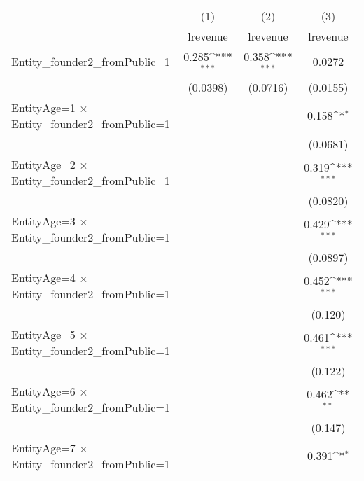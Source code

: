 {
\def\sym#1{\ifmmode^{#1}\else\(^{#1}\)\fi}
\begin{tabular}{l*{3}{c}}
\hline\hline
                    &\multicolumn{1}{c}{(1)}&\multicolumn{1}{c}{(2)}&\multicolumn{1}{c}{(3)}\\
                    &\multicolumn{1}{c}{lrevenue}&\multicolumn{1}{c}{lrevenue}&\multicolumn{1}{c}{lrevenue}\\
\hline
Entity\_founder2\_fromPublic=1&       0.285\sym{***}&       0.358\sym{***}&      0.0272         \\
                    &    (0.0398)         &    (0.0716)         &    (0.0155)         \\
[1em]
EntityAge=1 $\times$ Entity\_founder2\_fromPublic=1&                     &                     &       0.158\sym{*}  \\
                    &                     &                     &    (0.0681)         \\
[1em]
EntityAge=2 $\times$ Entity\_founder2\_fromPublic=1&                     &                     &       0.319\sym{***}\\
                    &                     &                     &    (0.0820)         \\
[1em]
EntityAge=3 $\times$ Entity\_founder2\_fromPublic=1&                     &                     &       0.429\sym{***}\\
                    &                     &                     &    (0.0897)         \\
[1em]
EntityAge=4 $\times$ Entity\_founder2\_fromPublic=1&                     &                     &       0.452\sym{***}\\
                    &                     &                     &     (0.120)         \\
[1em]
EntityAge=5 $\times$ Entity\_founder2\_fromPublic=1&                     &                     &       0.461\sym{***}\\
                    &                     &                     &     (0.122)         \\
[1em]
EntityAge=6 $\times$ Entity\_founder2\_fromPublic=1&                     &                     &       0.462\sym{**} \\
                    &                     &                     &     (0.147)         \\
[1em]
EntityAge=7 $\times$ Entity\_founder2\_fromPublic=1&                     &                     &       0.391\sym{*}  \\

\end{tabular}}
